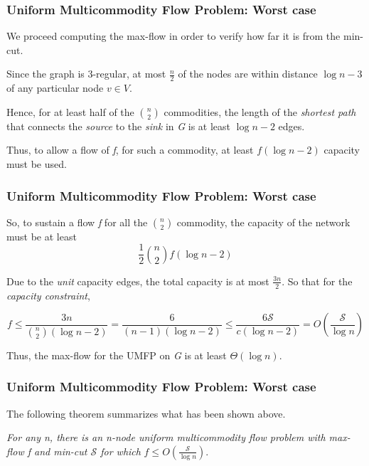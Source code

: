 \begin{frame}
\frametitle{Uniform Multicommodity Flow Problem: Worst case}

We proceed computing the max-flow in order to verify how far it is from the min-cut.

Since the graph is 3-regular, at most $\frac{n}{2}$ of the nodes are within distance $\log n -3$ of any particular node $v \in V$.

Hence, for at least half of the $\binom{n}{2}$ commodities, the length of the \emph{shortest path} that connects the \emph{source} to the \emph{sink} in \emph{G} is at least $\log n -2$ edges.

Thus, to allow a flow of \emph{f}, for such a commodity, at least $f(\log n -2)$ capacity must be used.

\end{frame}

\begin{frame}
\frametitle{Uniform Multicommodity Flow Problem: Worst case}

So, to sustain a flow \emph{f} for all the $\binom{n}{2}$ commodity, the capacity of the network must be at least
$$\frac{1}{2}\binom{n}{2}f(\log n - 2)$$

Due to the \emph{unit} capacity edges, the total capacity is at most $\frac{3n}{2}$. So that for the \emph{capacity constraint},

$$f\leq \frac{3n}{\binom{n}{2}(\log n - 2)} = \frac{6}{(n-1)(\log n -2)}\leq \frac{6\mathscr{S}}{c(\log n -2)}= O\left ( \frac{\mathscr{S}}{\log n} \right )$$

Thus, the max-flow for the UMFP on \emph{G} is at least $\Theta(\log n)$.

\end{frame}

\begin{frame}
\frametitle{Uniform Multicommodity Flow Problem: Worst case}

The following theorem summarizes what has been shown above.

\emph{For any n, there is an n-node uniform multicommodity flow problem with max-flow f and min-cut $\mathscr{S}$ for which} $f \leq O\left ( \frac{\mathscr{S}}{\log n} \right )$.

\end{frame}

